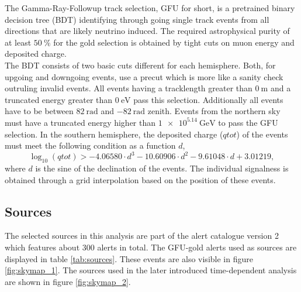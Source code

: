 The Gamma-Ray-Followup track selection, GFU for short, is a pretrained binary decision tree (BDT) identifying through going single track events from all directions that are likely neutrino induced.
The required astrophysical purity of at least $\SI{50}{\percent}$ for the gold selection is obtained by tight cuts on muon energy and deposited charge.\\
The BDT consists of two basic cuts different for each hemisphere.
Both, for upgoing and downgoing events, use a precut which is more like a sanity check outruling invalid events.
All events having a tracklength greater than $\SI{0}{\meter}$ and a truncated energy greater than $\SI{0}{\electronvolt}$ pass this selection.
Additionally all events have to be between $\SI{82}{\radian}$ and $\SI{-82}{\radian}$ zenith.
Events from the northern sky must have a truncated energy higher than $\SI{1e5.14}{\giga\electronvolt}$ to pass the GFU selection.
In the southern hemisphere, the deposited charge ($qtot$) of the events must meet the following condition as a function $d$,
\begin{equation}
  \log_{10}(qtot) > -4.06580\cdot d^3 - 10.60906\cdot d^2  -9.61048\cdot d + 3.01219,
\end{equation}
where $d$ is the sine of the declination of the events.
The individual signalness is obtained through a grid interpolation based on the position of these events.

\subsection{Sources}

The selected sources in this analysis are part of the alert catalogue version 2 which features about 300 alerts in total.
The GFU-gold alerts used as sources are displayed in table \ref{tab:sources}.
These events are also visible in figure \ref{fig:skymap_1}.
The sources used in the later introduced time-dependent analysis are shown in figure \ref{fig:skymap_2}.
